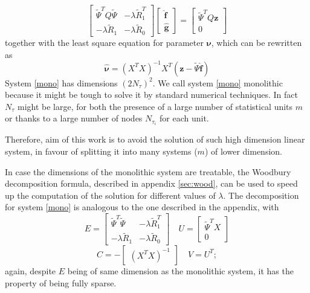 \begin{equation}
	\label{mono}
	\begin{bmatrix}
		\tilde{\Psi}^TQ\tilde{\Psi} & -\lambda \tilde{R}_1^T \\
		-\lambda \tilde{R}_1        & -\lambda \tilde{R}_0
	\end{bmatrix}
	\begin{bmatrix}
		\hat{\bm{f}} \\
		\hat{\bm{g}}
	\end{bmatrix}
	=
	\begin{bmatrix}
		\tilde{\Psi}^T Q\bm{z} \\
		0
	\end{bmatrix}
\end{equation}
together with the least square equation for parameter $\bm{\nu}$,
which can be rewritten as
\begin{equation}
	\label{nu}
	\hat{\bm{\nu}}=\left(X^TX\right)^{-1}X^T(\bm{z}-\tilde{\Psi}\hat{\bm{f}})
\end{equation}
System \ref{mono} has dimensions $\left(2 N_{\tau}\right)^2$. We call
system \ref{mono} monolithic because it might be tough to solve it by standard
numerical techniques. In fact $N_{\tau}$ might be large, for both the presence
of a large number of statistical units $m$ or thanks to a large number of nodes
$N_{\tau_i}$ for each unit.

Therefore, aim of this work is to avoid the solution of such high dimension
linear system, in favour of splitting it into many systems ($m$) of lower
dimension.

In case the dimensions of the monolithic system are treatable, the Woodbury
decomposition formula, described in appendix \ref{sec:wood}, can be used to
speed up the computation of the solution for different values of $\lambda$. The
decomposition for system \ref{mono} is analogous to the one described in the
appendix, with
\begin{equation}
	\label{eq:wootilde}
	E =
	\begin{bmatrix}
		\tilde{\Psi}^T\tilde{\Psi} & -\lambda \tilde{R}_1^T \\
		-\lambda \tilde{R}_1       & -\lambda \tilde{R}_0
	\end{bmatrix}
	\quad U =
	\begin{bmatrix}
		\tilde{\Psi}^TX \\
		0
	\end{bmatrix}
\end{equation}
\begin{equation*}
	C = -
	\begin{bmatrix}
		\left(X^TX\right)^{-1}
	\end{bmatrix}
	\quad V = U^T;
\end{equation*} again, despite $E$ being of same dimension as the monolithic system,
it has the property of being fully sparse.

